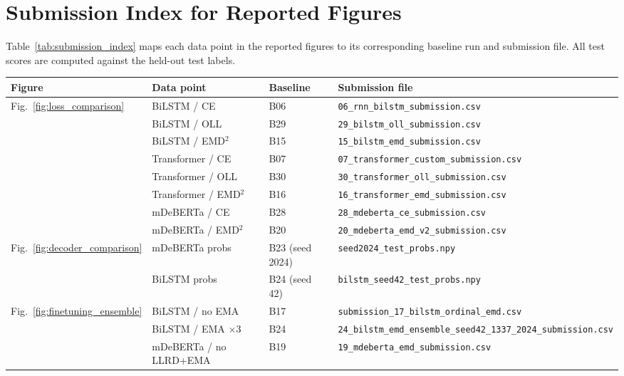 \documentclass{article}
\begin{document}
\section{Submission Index for Reported Figures}
\label{app:submissions}

Table~\ref{tab:submission_index} maps each data point in the reported figures to its corresponding baseline run and submission file.
All test scores are computed against the held-out test labels.

\begin{table}[H]
\centering
\small
\begin{tabular}{llll}
\toprule
\textbf{Figure} & \textbf{Data point} & \textbf{Baseline} & \textbf{Submission file} \\
\midrule
\multirow{8}{*}{Fig.~\ref{fig:loss_comparison}}
  & BiLSTM / CE              & B06 & \texttt{06\_rnn\_bilstm\_submission.csv} \\
  & BiLSTM / OLL             & B29 & \texttt{29\_bilstm\_oll\_submission.csv} \\
  & BiLSTM / EMD$^2$         & B15 & \texttt{15\_bilstm\_emd\_submission.csv} \\
  & Transformer / CE         & B07 & \texttt{07\_transformer\_custom\_submission.csv} \\
  & Transformer / OLL        & B30 & \texttt{30\_transformer\_oll\_submission.csv} \\
  & Transformer / EMD$^2$    & B16 & \texttt{16\_transformer\_emd\_submission.csv} \\
  & mDeBERTa / CE            & B28 & \texttt{28\_mdeberta\_ce\_submission.csv} \\
  & mDeBERTa / EMD$^2$       & B20 & \texttt{20\_mdeberta\_emd\_v2\_submission.csv} \\
\midrule
\multirow{2}{*}{Fig.~\ref{fig:decoder_comparison}}
  & mDeBERTa probs     & B23 (seed 2024) & \texttt{seed2024\_test\_probs.npy} \\
  & BiLSTM probs       & B24 (seed 42)   & \texttt{bilstm\_seed42\_test\_probs.npy} \\
\midrule
\multirow{7}{*}{Fig.~\ref{fig:finetuning_ensemble}}
  & BiLSTM / no EMA              & B17 & \texttt{submission\_17\_bilstm\_ordinal\_emd.csv} \\
  & BiLSTM / EMA $\times$3       & B24 & \texttt{24\_bilstm\_emd\_ensemble\_seed42\_1337\_2024\_submission.csv} \\
  & mDeBERTa / no LLRD+EMA       & B19 & \texttt{19\_mdeberta\_emd\_submission.csv} \\

\end{tabular}
\end{table}
\end{document}
